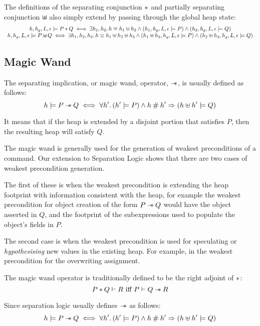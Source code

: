 \documentclass[a4paper,notitlepage]{report}
\begin{document}
The definitions of the separating conjunction $\mathbin{*}$ and partially separating
conjunction $\mathbin{\sqcup\mkern-10mu*}$ also simply extend by passing through the global heap state:
\[\begin{array}{c}
  h,h_g,L,\epsilon \models P \mathbin{*} Q \iff
    \exists h_1,h_2 \mathpunct{.} h \equiv h_1 \uplus h_2 \land
    (h_1,h_g,L,\epsilon \models P) \land (h_2,h_g,L,\epsilon \models Q) \\
  h,h_g,L,\epsilon \models P \mathbin{\sqcup\mkern-10mu*} Q \iff
    \exists h_1,h_2,h_3 \mathpunct{.} h \equiv h_1 \uplus h_2 \uplus h_3 \land
    (h_1 \uplus h_3, h_g, L, \epsilon \models P) \land
    (h_2 \uplus h_3, h_g, L, \epsilon \models Q)
\end{array}\]

\subsection{Magic Wand}
\label{sec:wand}
The separating implication, or magic wand, operator, $\mathbin{-\mkern-6mu *}$, is usually defined
as follows:
\[
  h \models P \mathbin{-\mkern-6mu *} Q \iff \forall h' \mathpunct{.} (h' \models P) \land h \mathbin{\#}
    h' \Rightarrow (h \uplus h' \models Q)
\]

It means that if the heap is extended by a disjoint portion that satisfies $P$,
then the resulting heap will satisfy $Q$.

The magic wand is generally used for the generation of weakest preconditions of
a command. Our extension to Separation Logic shows that there are two cases of
weakest precondition generation.

The first of these is when the weakest
precondition is extending the heap footprint with
information consistent with the heap, for example the weakest precondition for
object creation of the form $P \mathbin{-\mkern-6mu *} Q$ would have the object asserted in $Q$,
and the footprint of the subexpressions used to populate the object's fields in
$P$.

The second case is when the weakest precondition is used for speculating or
\emph{hypothesising} new values in the existing heap. For example, in the
weakest precondition for the overwriting assignment.

The magic wand operator is traditionally defined to be the right adjoint of $\mathbin{*}$:
\newcommand{\entails}{\vdash}
\[
P \sep Q \entails R \text{ iff } P \entails Q \wand R
\]

Since separation logic usually defines $\mathbin{-\mkern-6mu *}$
as follows:
\[
  h \models P \mathbin{-\mkern-6mu *} Q \iff \forall h' \mathpunct{.} (h' \models P) \land h \mathbin{\#}
    h' \Rightarrow (h \uplus h' \models Q)
\]
\end{document}
